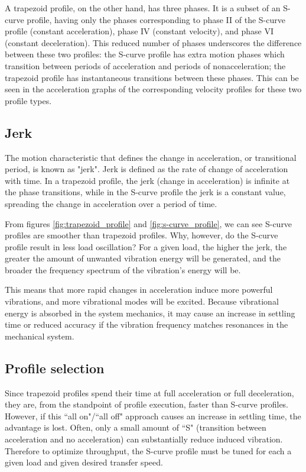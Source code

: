 A trapezoid profile, on the other hand, has three phases. It is a subset of an
S-curve profile, having only the phases corresponding to phase II of the S-curve
profile (constant acceleration), phase IV (constant velocity), and phase VI
(constant deceleration). This reduced number of phases underscores the
difference between these two profiles: the S-curve profile has extra motion
phases which transition between periods of acceleration and periods of
nonacceleration; the trapezoid profile has instantaneous transitions between
these phases. This can be seen in the acceleration graphs of the corresponding
velocity profiles for these two profile types.

\subsection{Jerk}

The motion characteristic that defines the change in acceleration, or
transitional period, is known as "jerk". Jerk is defined as the rate of change
of acceleration with time. In a trapezoid profile, the jerk (change in
acceleration) is infinite at the phase transitions, while in the S-curve profile
the jerk is a constant value, spreading the change in acceleration over a period
of time.

From figures \ref{fig:trapezoid_profile} and \ref{fig:s-curve_profile}, we can
see S-curve profiles are smoother than trapezoid profiles. Why, however, do the
S-curve profile result in less load oscillation? For a given load, the higher
the jerk, the greater the amount of unwanted vibration energy will be generated,
and the broader the frequency spectrum of the vibration's energy will be.

This means that more rapid changes in acceleration induce more powerful
vibrations, and more vibrational modes will be excited. Because vibrational
energy is absorbed in the system mechanics, it may cause an increase in
\gls{settling time} or reduced accuracy if the vibration frequency matches
resonances in the mechanical system.

\subsection{Profile selection}

Since trapezoid profiles spend their time at full acceleration or full
deceleration, they are, from the standpoint of profile execution, faster than
S-curve profiles. However, if this ``all on"/``all off" approach causes an
increase in settling time, the advantage is lost. Often, only a small amount of
``S" (transition between acceleration and no acceleration) can substantially
reduce induced vibration. Therefore to optimize throughput, the S-curve profile
must be tuned for each a given load and given desired transfer speed.

